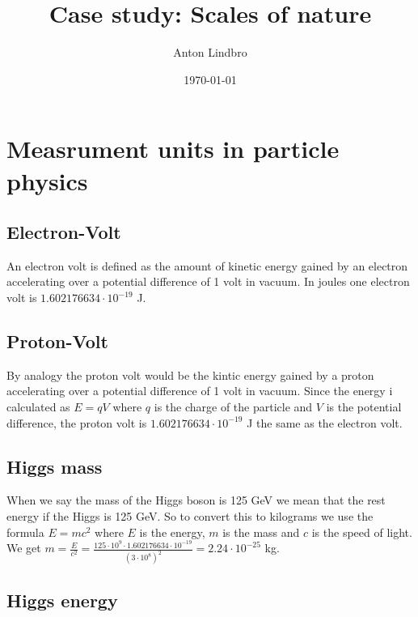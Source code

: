 \documentclass[a4paper]{article}
\title{Case study: Scales of nature}
\author{Anton Lindbro}
\date{\today}
\begin{document}
\maketitle

\section{Measrument units in particle physics}

\subsection{Electron-Volt}

An electron volt is defined as the amount of kinetic energy gained by an electron accelerating over a potential difference of 1 volt in vacuum. In joules one electron volt is $1.602176634 \cdot 10^{-19}$ J.

\subsection{Proton-Volt}

By analogy the proton volt would be the kintic energy gained by a proton accelerating over a potential difference of 1 volt in vacuum. Since the energy i calculated as $E = qV$ where $q$ is the charge of the particle and $V$ is the potential difference, the proton volt is $1.602176634 \cdot 10^{-19}$ J the same as the electron volt. 
\subsection{Higgs mass}

When we say the mass of the Higgs boson is 125 GeV we mean that the rest energy if the Higgs is 125 GeV. So to convert this to kilograms we use the formula $E = mc^2$ where $E$ is the energy, $m$ is the mass and $c$ is the speed of light. We get $m = \frac{E}{c^2} = \frac{125 \cdot 10^9 \cdot 1.602176634 \cdot 10^{-19}}{(3 \cdot 10^8)^2} = 2.24 \cdot 10^{-25}$ kg.

\subsection{Higgs energy}
\end{document}
